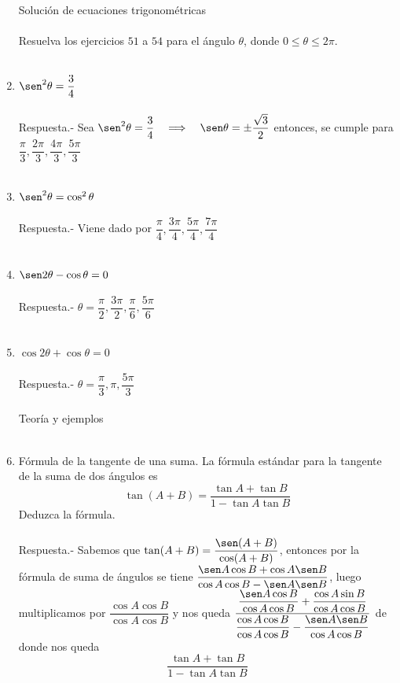 \begin{enumerate}
Solución de ecuaciones trigonométricas\\\\

Resuelva los ejercicios $51$ a $54$ para el ángulo $\theta$, donde $0\leq \theta\leq 2\pi$.\\\\

\item $\sen^2 \theta = \dfrac{3}{4}$\\\\
    Respuesta.-\; Sea $\sen^2 \theta = \dfrac{3}{4} \quad \Longrightarrow \quad \sen \theta = \pm \dfrac{\sqrt{3}}{2}$ entonces, se cumple para $\dfrac{\pi}{3},\dfrac{2\pi}{3},\dfrac{4\pi}{3},\dfrac{5\pi}{3}$\\\\

\item $\sen^2 \theta = \cos^2 \theta$\\\\
    Respuesta.-\; Viene dado por $\dfrac{\pi}{4}, \dfrac{3\pi}{4},\dfrac{5\pi}{4},\dfrac{7\pi}{4}$\\\\

\item $\sen 2\theta - \cos \theta = 0$\\\\
    Respuesta.-\; $\theta = \dfrac{\pi}{2},\dfrac{3\pi}{2},\dfrac{\pi}{6},\dfrac{5\pi}{6}$\\\\

\item $\cos 2 \theta + \cos \theta = 0$\\\\
    Respuesta.-\; $\theta = \dfrac{\pi}{3},\pi,\dfrac{5\pi}{3}$\\\\

Teoría y ejemplos\\\\

\item Fórmula de la tangente de una suma. La fórmula estándar para la tangente de la suma de dos ángulos es $$\tan(A+B)=\dfrac{\tan A + \tan B}{1 - \tan A \tan B}$$
Deduzca la fórmula.\\\\
    Respuesta.-\; Sabemos que $\tan(A+B) = \dfrac{\sen (A+B)}{\cos (A+B)}$, entonces por la fórmula de suma de ángulos se tiene $\dfrac{\sen A \cos B + \cos A \sen B}{\cos A \cos B - \sen A \sen B}$, luego multiplicamos por $\dfrac{\cos A  \cos B}{\cos A \cos B}$ y nos queda $\dfrac{\dfrac{\sen A \cos B}{\cos A \cos B} + \dfrac{\cos A \sin B}{\cos A \cos B}}{\dfrac{\cos A \cos B}{\cos A \cos B} - \dfrac{\sen A \sen B}{\cos A \cos B}}$ de donde nos queda $$\dfrac{\tan A + \tan B}{1 - \tan A \tan B}$$\\


\end{enumerate}
